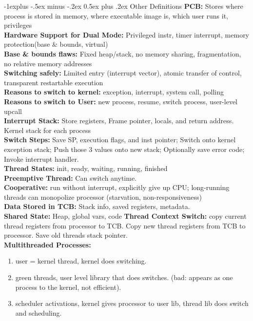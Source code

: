\documentclass[8pt,landscape]{article}
\makeatletter
\renewcommand{\subsection}{\@startsection{subsection}{2}{0mm}%
                                {-1explus -.5ex minus -.2ex}%
                                {0.5ex plus .2ex}%
                                {\normalfont\normalsize\bfseries}}
\makeatother
\begin{document}
\begin{multicols}{3}
\subsection{Other Definitions}
{\bf PCB:} Stores where process is stored in memory, where executable image is, which user runs it, privileges\\
{\bf Hardware Support for Dual Mode:} Privileged instr, timer interrupt, memory protection(base \& bounds, virtual)\\
{\bf Base \& bounds flaws:} Fixed heap/stack, no memory sharing, fragmentation, no relative memory addresses\\ 
{\bf Switching safely:} Limited entry (interrupt vector), atomic transfer of control, transparent restartable execution\\
{\bf Reasons to switch to kernel:} exception, interrupt, system call, polling\\
\textbf{Reasons to switch to User:} new process, resume, switch process, user-level upcall \\
\textbf{Interrupt Stack:} Store registers, Frame pointer, locals, and return address. Kernel stack for each process\\
\textbf{Switch Steps:} Save SP, execution flags, and inst pointer; Switch onto kernel exception stack; Push those 3 values onto new stack; Optionally save error code; Invoke interrupt handler.\\ 
\textbf{Thread States:} init, ready, waiting, running, finished\\ 
\textbf{Preemptive Thread:} Can switch anytime.\\
\textbf{Cooperative:} run without interrupt, explicitly give up CPU; long-running threads can monopolize processor (starvation, non-responsiveness) \\
\textbf{Data Stored in TCB:} Stack info, saved registers, metadata.\\ 
\textbf{Shared State:} Heap, global vars, code
\textbf{Thread Context Switch:} copy current thread registers from processor to TCB. Copy new thread registers from TCB to processor. Save old threads stack pointer.\\
\textbf{Multithreaded Processes:} 
\begin{enumerate}
    \item user = kernel thread, kernel does switching.
    \item green threads, user level library that does switches. (bad: appears as one process to the kernel, not efficient).
    \item scheduler activations, kernel gives processor to user lib, thread lib does switch and scheduling.

\end{enumerate}
\end{multicols}
\end{document}
